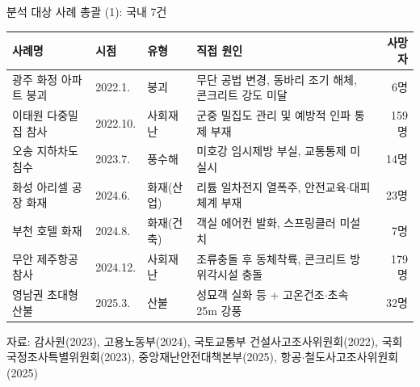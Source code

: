 \documentclass[aspectratio=169,10pt]{beamer}
\newcommand{\src}[1]{\par\vfill{\tiny\color{muted}#1}}
\begin{document}
\begin{frame}{분석 대상 사례 총괄 (1): 국내 7건}
  \footnotesize
  \begin{tabularx}{\textwidth}{@{}l l l Y r@{}}
    \toprule
    사례명 & 시점 & 유형 & 직접 원인 & 사망자 \\
    \midrule
    광주 화정 아파트 붕괴 & 2022.1. & 붕괴 & 무단 공법 변경, 동바리 조기 해체, 콘크리트 강도 미달 & 6명 \\
    이태원 다중밀집 참사 & 2022.10. & 사회재난 & 군중 밀집도 관리 및 예방적 인파 통제 부재 & 159명 \\
    오송 지하차도 침수 & 2023.7. & 풍수해 & 미호강 임시제방 부실, 교통통제 미실시 & 14명 \\
    화성 아리셀 공장 화재 & 2024.6. & 화재(산업) & 리튬 일차전지 열폭주, 안전교육$\cdot$대피체계 부재 & 23명 \\
    부천 호텔 화재 & 2024.8. & 화재(건축) & 객실 에어컨 발화, 스프링클러 미설치 & 7명 \\
    무안 제주항공 참사 & 2024.12. & 사회재난 & 조류충돌 후 동체착륙, 콘크리트 방위각시설 충돌 & 179명 \\
    영남권 초대형 산불 & 2025.3. & 산불 & 성묘객 실화 등 + 고온건조$\cdot$초속 25m 강풍 & 32명 \\
    \bottomrule
  \end{tabularx}
  \src{자료: 감사원(2023), 고용노동부(2024), 국토교통부 건설사고조사위원회(2022), 국회 국정조사특별위원회(2023), 중앙재난안전대책본부(2025), 항공$\cdot$철도사고조사위원회(2025)}
\end{frame}
\end{document}
